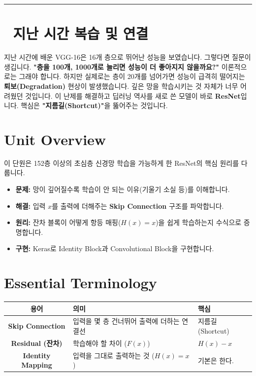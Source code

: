 \documentclass[11pt,a4paper]{book}
\theoremstyle{definition}
\begin{document}
\vspace{0.5cm}
\hrule
\vspace{0.5cm}

\section*{🔗 지난 시간 복습 및 연결}
지난 시간에 배운 VGG-16은 16개 층으로 뛰어난 성능을 보였습니다. 그렇다면 질문이 생깁니다.
\textbf{"층을 100개, 1000개로 늘리면 성능이 더 좋아지지 않을까요?"}
이론적으로는 그래야 합니다. 하지만 실제로는 층이 20개를 넘어가면 성능이 급격히 떨어지는 \textbf{퇴보(Degradation)} 현상이 발생했습니다. 깊은 망을 학습시키는 것 자체가 너무 어려웠던 것입니다.
이 난제를 해결하고 딥러닝 역사를 새로 쓴 모델이 바로 \textbf{ResNet}입니다. 핵심은 \textbf{"지름길(Shortcut)"}을 뚫어주는 것입니다.

\section{Unit Overview}
\begin{summarybox}[title={핵심 목표}]
이 단원은 152층 이상의 초심층 신경망 학습을 가능하게 한 ResNet의 핵심 원리를 다룹니다.
\begin{itemize}
    \item \textbf{문제:} 망이 깊어질수록 학습이 안 되는 이유(기울기 소실 등)를 이해합니다.
    \item \textbf{해결:} 입력 $x$를 출력에 더해주는 \textbf{Skip Connection} 구조를 파악합니다.
    \item \textbf{원리:} 잔차 블록이 어떻게 항등 매핑($H(x)=x$)을 쉽게 학습하는지 수식으로 증명합니다.
    \item \textbf{구현:} Keras로 Identity Block과 Convolutional Block을 구현합니다.
\end{itemize}
\end{summarybox}

\section{Essential Terminology}
\begin{center}
\begin{tabular}{|c|l|l|}
\hline
\textbf{용어} & \textbf{의미} & \textbf{핵심} \\ \hline
\textbf{Skip Connection} & 입력을 몇 층 건너뛰어 출력에 더하는 연결선 & 지름길 (Shortcut) \\ \hline
\textbf{Residual (잔차)} & 학습해야 할 차이 ($F(x)$) & $H(x) - x$ \\ \hline
\textbf{Identity Mapping} & 입력을 그대로 출력하는 것 ($H(x)=x$) & 기본은 한다. \\ \hline
\end{tabular}
\end{center}
\end{document}
